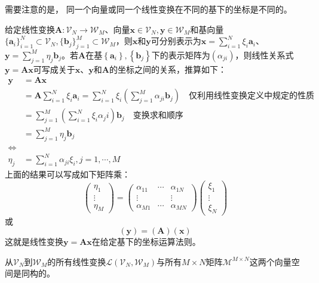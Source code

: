 \documentclass[main.tex]{subfiles}
\begin{document}
需要注意的是， 同一个向量或同一个线性变换在不同的基下的坐标是不同的。

给定线性变换$\mathbf{A}:\mathcal{V}_N\rightarrow\mathcal{W}_M$、向量$\mathbf{x}\in\mathcal{V}_N,\mathbf{y}\in\mathcal{W}_M$和基向量$\{\mathbf{a}_i\}_{i=1}^N\subset\mathcal{V}_N,\{\mathbf{b}_j\}_{j=1}^M\subset\mathcal{W}_M$，则$\mathbf{x}$和$\mathbf{y}$可分别表示为$\mathbf{x}=\sum_{i=1}^N\xi_i\mathbf{a}_i$、$\mathbf{y}=\sum_{j=1}^M\eta_j\mathbf{b}_j$。若$\mathbf{A}$在基$\left\{\mathbf{a}_i\right\},\left\{\mathbf{b}_j\right\}$下的表示矩阵为$\left(\alpha_{ji}\right)$，则线性关系式$\mathbf{y}=\mathbf{Ax}$可写成关于$\mathbf{x}$、$\mathbf{y}$和$\mathbf{A}$的坐标之间的关系，推算如下：
\begin{equation*}
\begin{split}
    \mathbf{y}&=\mathbf{Ax}\\
    &=\mathbf{A}\sum_{i=1}^N\xi_i\mathbf{a}_i=\sum_{i=1}^N\xi_i\left(\sum_{j=1}^M\alpha_{ji}\mathbf{b}_j\right)\quad\text{仅利用线性变换定义中规定的性质}\\
    &=\sum_{j=1}^M\left(\sum_{i=1}^N\xi_i\alpha_ji\right)\mathbf{b}_j\quad\text{变换求和顺序}\\
    &=\sum_{j=1}^M\eta_j\mathbf{b}_j\\
    \Leftrightarrow\\
    \eta_j&=\sum_{i=1}^N\alpha_{ji}\xi_i,j=1,\cdots,M
\end{split}
\end{equation*}
上面的结果可以写成如下矩阵乘：
\[\left(\begin{array}{ccc}\eta_1\\\vdots\\\eta_M\end{array}\right)=\left(\begin{array}{ccc}\alpha_{11}&\cdots&\alpha_{1N}\\\vdots&&\vdots\\\alpha_{M1}&\cdots&\alpha_{MN}\end{array}\right)\left(\begin{array}{ccc}\xi_1\\\vdots\\\xi_N\end{array}\right)\]
或
\[\left(\mathbf{y}\right)=\left(\mathbf{A}\right)\left(\mathbf{x}\right)\]
这就是线性变换$\mathbf{y}=\mathbf{Ax}$在给定基下的坐标运算法则。

\begin{theorem}
从$\mathcal{V}_N$到$\mathcal{W}_M$的所有线性变换$\mathcal{L}\left(\mathcal{V}_N,\mathcal{W}_M\right)$与所有$M\times N$矩阵$\mathcal{M}^{M\times N}$这两个向量空间是同构的。
\label{theo:lin_matrix_isomorphism}
\end{theorem}
\end{document}
